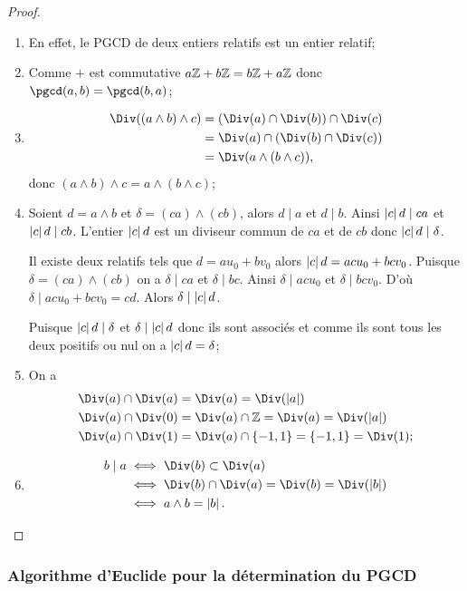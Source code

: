 \begin{proof}
  \begin{enumerate}
  \item En effet, le PGCD de deux entiers relatifs est un entier relatif;
  \item Comme $+$ est commutative $a\mathbb{Z}+b\mathbb{Z}=b\mathbb{Z}+a\mathbb{Z}$ donc $\pgcd(a,b)=\pgcd(b,a)$;
  \item
    \begin{align}
      \Div((a \wedge b) \wedge c)&= (\Div(a) \cap \Div(b)) \cap \Div(c)\\
      &=\Div(a) \cap (\Div(b) \cap \Div(c))\\
      &=\Div(a \wedge (b \wedge c)),
    \end{align}
    donc $(a \wedge b) \wedge c=a \wedge (b \wedge c)$;
  \item Soient $d= a \wedge b$ et $\delta=(ca) \wedge (cb)$, alors $d\mid a$ et $d\mid b$. Ainsi $\left\lvert c\right\rvert d\mid ca$ et $\left\lvert c\right\rvert d\mid cb$. L'entier $\left\lvert c\right\rvert d$ est un diviseur commun de $ca$ et de $cb$ donc $\left\lvert c\right\rvert d\mid \delta$.

    Il existe deux relatifs tels que $d=au_0+bv_0$ alors $\left\lvert c\right\rvert d=acu_0+bcv_0$. Puisque $\delta = (ca) \wedge (cb)$ on a $\delta \mid ca$ et $\delta \mid  bc$. Ainsi $\delta\mid acu_0$ et $\delta \mid  bcv_0$. D'où $\delta \mid  acu_0+bcv_0 =cd$. Alors $\delta \mid  \left\lvert c\right\rvert d$.

    Puisque $\left\lvert c\right\rvert d\mid \delta$ et $\delta \mid  \left\lvert c\right\rvert d$ donc ils sont associés et comme ils sont tous les deux positifs ou nul on a $\left\lvert c\right\rvert d=\delta$;
  \item On a
    \begin{align}
      \Div(a) \cap \Div(a) &= \Div(a) = \Div(\abs{a}) \\
      \Div(a) \cap \Div(0) &= \Div(a) \cap \Z = \Div(a) =\Div(\abs{a}) \\
      \Div(a) \cap \Div(1) &= \Div(a) \cap \{-1, 1\} = \{-1, 1\} = \Div(1);
    \end{align}
  \item
    \begin{align}
      b\mid a &\iff \Div(b) \subset \Div(a) \\
      &\iff \Div(b) \cap \Div(a) = \Div(b) = \Div(\abs{b})\\
      &\iff a \wedge b = \abs{b}.
    \end{align}
  \end{enumerate}
\end{proof}

\subsubsection{Algorithme d'Euclide pour la détermination du PGCD}


